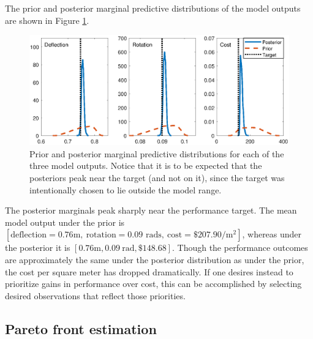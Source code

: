 \documentclass[12pt]{article}
\begin{document}
%
The prior and posterior marginal predictive distributions of the model outputs are shown in Figure \ref{fig:prior_post_pred_comp}.
%
\begin{figure}
\centering
\includegraphics[scale=0.8]{FIG_prior_vs_posterior_dist}
\caption{Prior and posterior marginal predictive distributions for each of the three model outputs. Notice that it is to be expected that the posteriors peak near the target (and not on it), since the target was intentionally chosen to lie outside the model range.}
\label{fig:prior_post_pred_comp}
\end{figure}
%
The posterior marginals peak sharply near the performance target.
%
The mean model output under the prior is $[\text{deflection}=0.76\mathrm m,\ \text{rotation}=0.09\text{ rads},\ \text{cost}=\$207.90/\mathrm m^2]$, whereas under the posterior it is $[0.76\mathrm m,0.09\ \mathrm{rad},\$148.68]$.
%
Though the performance outcomes are approximately the same under the posterior distribution as under the prior, the cost per square meter has dropped dramatically.
%
If one desires instead to prioritize gains in performance over cost, this can be accomplished by selecting desired observations that reflect those priorities. 

\subsection{Pareto front estimation}\label{removing_cal_pars}

\end{document}
